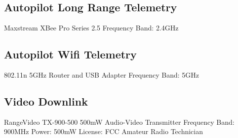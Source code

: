 \documentclass[12pt]{report}
\begin{document}
\subsection{Autopilot Long Range Telemetry}
Maxstream XBee Pro Series 2.5
Frequency Band: 2.4GHz
\subsection{Autopilot Wifi Telemetry}
802.11n 5GHz Router and USB Adapter
Frequency Band: 5GHz
\subsection{Video Downlink}
RangeVideo TX-900-500 500mW Audio-Video Transmitter
Frequency Band: 900MHz
Power: 500mW
License: FCC Amateur Radio Technician
\end{document}
